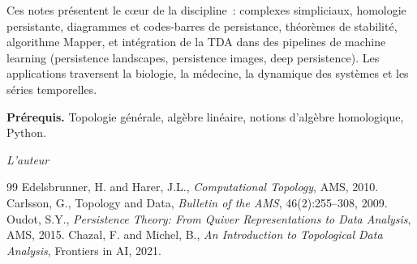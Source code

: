 \documentclass[12pt,a4paper,twoside]{book}
\theoremstyle{definition}
\theoremstyle{plain}
\theoremstyle{remark}
\begin{document}
\medskip

Ces notes pr\'esentent le c\oe ur de la discipline~: complexes simpliciaux, homologie persistante, diagrammes et codes-barres de persistance, th\'eor\`emes de stabilit\'e, algorithme Mapper, et int\'egration de la TDA dans des pipelines de machine learning (persistence landscapes, persistence images, deep persistence). Les applications traversent la biologie, la m\'edecine, la dynamique des syst\`emes et les s\'eries temporelles.

\medskip

\noindent\textbf{Pr\'erequis.} Topologie g\'en\'erale, alg\`ebre lin\'eaire, notions d'alg\`ebre homologique, Python.

\vfill
\hfill\textit{L'auteur}


\mainmatter














\backmatter
\begin{thebibliography}{99}
 Edelsbrunner, H. and Harer, J.L., \emph{Computational Topology}, AMS, 2010.
 Carlsson, G., Topology and Data, \emph{Bulletin of the AMS}, 46(2):255--308, 2009.
 Oudot, S.Y., \emph{Persistence Theory: From Quiver Representations to Data Analysis}, AMS, 2015.
 Chazal, F. and Michel, B., \emph{An Introduction to Topological Data Analysis}, Frontiers in AI, 2021.
\end{thebibliography}
\printindex
\end{document}
